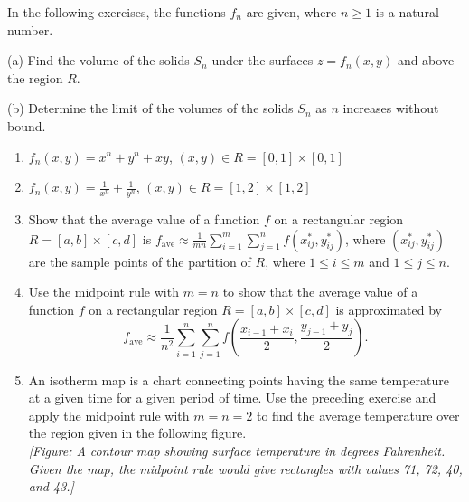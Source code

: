 \documentclass{exercises}
\begin{document}
In the following exercises, the functions $f_{n}$ are given, where $n\ge1$ is a natural number.


(a) Find the volume of the solids $S_{n}$ under the surfaces $z=f_{n}(x,y)$ and above the region $R$.


(b) Determine the limit of the volumes of the solids $S_{n}$ as $n$ increases without bound.

\begin{enumerate}[resume]
\item $f_{n}(x,y)=x^{n}+y^{n}+xy$, $(x,y)\in R=[0,1]\times [0,1]$
\item $f_{n}(x,y)=\frac{1}{x^{n}}+\frac{1}{y^{n}}$, $(x,y)\in R=[1,2]\times [1,2]$
\item Show that the average value of a function $f$ on a rectangular region $R=[a,b]\times [c,d]$ is $f_{\text{ave}}\approx \frac{1}{mn}\sum_{i=1}^{m}\sum_{j=1}^{n}f(x_{ij}^{*},y_{ij}^{*})$, where $(x_{ij}^{*},y_{ij}^{*})$ are the sample points of the partition of $R$, where $1\le i\le m$ and $1\le j\le n$.
\item Use the midpoint rule with $m=n$ to show that the average value of a function $f$ on a rectangular region $R=[a,b]\times [c,d]$ is approximated by \[f_{\text{ave}}\approx \frac{1}{n^{2}}\sum_{i=1}^{n}\sum_{j=1}^{n}f\left(\frac{x_{i-1}+x_{i}}{2},\frac{y_{j-1}+y_{j}}{2}\right).\]
\item An isotherm map is a chart connecting points having the same temperature at a given time for a given period of time. Use the preceding exercise and apply the midpoint rule with $m=n=2$ to find the average temperature over the region given in the following figure. \\ \textit{[Figure: A contour map showing surface temperature in degrees Fahrenheit. Given the map, the midpoint rule would give rectangles with values 71, 72, 40, and 43.]}
\end{enumerate}
\end{document}
